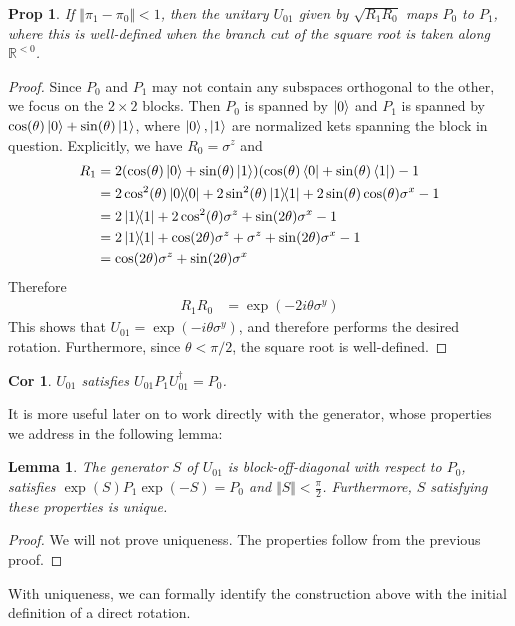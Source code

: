 \documentclass[11pt]{article}
\newtheorem{prop}{Prop}
\newtheorem{lem}{Lemma}
\newtheorem{cor}{Cor}
\begin{document}
\begin{prop}
    If $\Vert \pi_1 - \pi_0 \Vert < 1$, then the unitary $U_{01}$ given by $\sqrt{R_1R_0}$ maps $P_0$ to $P_1$, where this is well-defined when the branch cut of the square root is taken along $\mathbb R^{<0}$. 
\end{prop}
\begin{proof}
    Since $P_0$ and $P_1$ may not contain any subspaces orthogonal to the other, we focus on the $2\times 2$ blocks. Then $P_0$ is spanned by $\ket{0}$ and $P_1$ is spanned by $\cos(\theta)\ket{0} + \sin(\theta)\ket{1}$, where $\ket{0}, \ket{1}$ are normalized kets spanning the block in question. Explicitly, we have $R_0 = \sigma^z$ and 
\begin{align}
    R_1 &= 2(\cos(\theta)\ket{0} + \sin(\theta)\ket{1})(\cos(\theta)\bra{0} + \sin(\theta)\bra{1}) - 1 \\
        &= 2\cos^{2}(\theta)\ketbra{0}{0} + 2\sin^{2}(\theta)\ketbra{1}{1} + 2\sin(\theta)\cos(\theta)\sigma^x-1 \\
        &= 2\ketbra{1}{1}  + 2\cos^{2}(\theta)\sigma^z + \sin(2\theta)\sigma^x-1 \\
        &= 2\ketbra{1}{1}  +\cos(2\theta)\sigma^z + \sigma^z + \sin(2\theta)\sigma^x-1 \\
        &= \cos(2\theta)\sigma^z + \sin(2\theta)\sigma^x
\end{align}
Therefore
\begin{align}
    R_1R_0 &= \exp(-2i\theta \sigma^y)
\end{align}
This shows that $U_{01} = \exp(-i\theta \sigma^y)$, and therefore performs the desired rotation. Furthermore, since $\theta < \pi/2$, the square root is well-defined.
\end{proof}
\begin{cor}
    $U_{01}$ satisfies $U_{01}P_1 U_{01}^\dagger = P_0$. 
\end{cor}
It is more useful later on to work directly with the generator, whose properties we address in the following lemma:
\begin{lem}
    The generator $S$ of $U_{01}$ is block-off-diagonal with respect to $P_0$, satisfies $\exp(S)P_1\exp(-S) = P_0$ and $\Vert S \Vert < \frac{\pi}{2}$. Furthermore, $S$ satisfying these properties is unique.
\end{lem}
\begin{proof}
    We will not prove uniqueness. The properties follow from the previous proof.
\end{proof}
With uniqueness, we can formally identify the construction above with the initial definition of a direct rotation.
\end{document}
